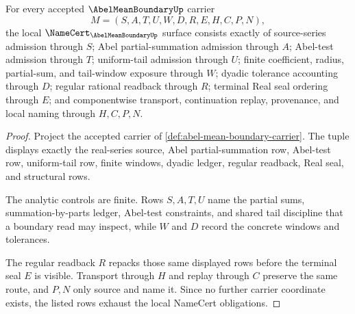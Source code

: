 \begin{theorem}
\label{thm:abel-mean-boundary-namecert-obligations}
For every accepted $\AbelMeanBoundaryUp$ carrier
$$
M=(S,A,T,U,W,D,R,E,H,C,P,N),
$$
the local $\NameCert_{\AbelMeanBoundaryUp}$ surface consists exactly of source-series admission through $S$; Abel partial-summation admission through $A$; Abel-test admission through $T$; uniform-tail admission through $U$; finite coefficient, radius, partial-sum, and tail-window exposure through $W$; dyadic tolerance accounting through $D$; regular rational readback through $R$; terminal Real seal ordering through $E$; and componentwise transport, continuation replay, provenance, and local naming through $H,C,P,N$.
\end{theorem}
\begin{proof}
Project the accepted carrier of \autoref{def:abel-mean-boundary-carrier}. The tuple displays exactly the real-series source, Abel partial-summation row, Abel-test row, uniform-tail row, finite windows, dyadic ledger, regular readback, Real seal, and structural rows.

The analytic controls are finite. Rows $S,A,T,U$ name the partial sums, summation-by-parts ledger, Abel-test constraints, and shared tail discipline that a boundary read may inspect, while $W$ and $D$ record the concrete windows and tolerances.

The regular readback $R$ repacks those same displayed rows before the terminal seal $E$ is visible. Transport through $H$ and replay through $C$ preserve the same route, and $P,N$ only source and name it. Since no further carrier coordinate exists, the listed rows exhaust the local NameCert obligations.
\end{proof}

